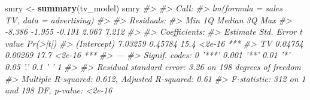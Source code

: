 \documentclass[]{book}
\newenvironment{Shaded}{\begin{snugshade}}{\end{snugshade}}
\newcommand{\CommentTok}[1]{\textcolor[rgb]{0.56,0.35,0.01}{\textit{#1}}}
\newcommand{\ControlFlowTok}[1]{\textcolor[rgb]{0.13,0.29,0.53}{\textbf{#1}}}
\newcommand{\DataTypeTok}[1]{\textcolor[rgb]{0.13,0.29,0.53}{#1}}
\newcommand{\DecValTok}[1]{\textcolor[rgb]{0.00,0.00,0.81}{#1}}
\newcommand{\KeywordTok}[1]{\textcolor[rgb]{0.13,0.29,0.53}{\textbf{#1}}}
\newcommand{\NormalTok}[1]{#1}
\newcommand{\OperatorTok}[1]{\textcolor[rgb]{0.81,0.36,0.00}{\textbf{#1}}}
\newcommand{\StringTok}[1]{\textcolor[rgb]{0.31,0.60,0.02}{#1}}
\begin{document}
\begin{Shaded}
\begin{Highlighting}[]
\NormalTok{smry <-}\StringTok{ }\KeywordTok{summary}\NormalTok{(tv_model)}
\NormalTok{smry}
\CommentTok{#> }
\CommentTok{#> Call:}
\CommentTok{#> lm(formula = sales ~ TV, data = advertising)}
\CommentTok{#> }
\CommentTok{#> Residuals:}
\CommentTok{#>    Min     1Q Median     3Q    Max }
\CommentTok{#> -8.386 -1.955 -0.191  2.067  7.212 }
\CommentTok{#> }
\CommentTok{#> Coefficients:}
\CommentTok{#>             Estimate Std. Error t value Pr(>|t|)    }
\CommentTok{#> (Intercept)  7.03259    0.45784    15.4   <2e-16 ***}
\CommentTok{#> TV           0.04754    0.00269    17.7   <2e-16 ***}
\CommentTok{#> ---}
\CommentTok{#> Signif. codes:  0 '***' 0.001 '**' 0.01 '*' 0.05 '.' 0.1 ' ' 1}
\CommentTok{#> }
\CommentTok{#> Residual standard error: 3.26 on 198 degrees of freedom}
\CommentTok{#> Multiple R-squared:  0.612,  Adjusted R-squared:  0.61 }
\CommentTok{#> F-statistic:  312 on 1 and 198 DF,  p-value: <2e-16}
\end{Highlighting}
\end{Shaded}

\begin{Shaded}
\end{Shaded}
\end{document}
